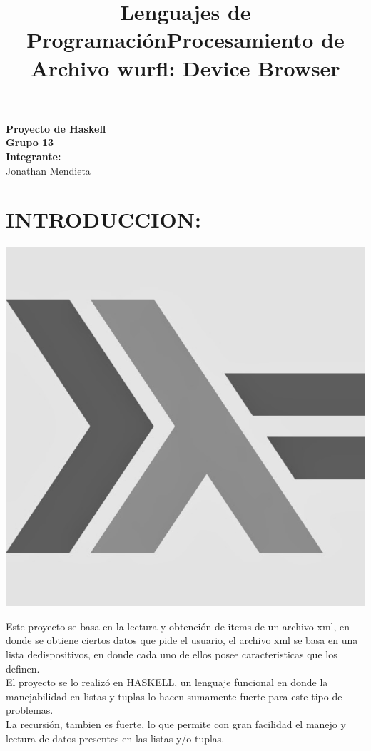 \documentclass[11pt]{article} %
\title{Lenguajes de Programación}
\begin{document}
\maketitle


\begin{center}
\textbf{
{\LARGE Proyecto de Haskell}}\\[1.25cm]
{\LARGE \textbf{Grupo 13}}\\[1cm]
{\LARGE \textbf{ Integrante:}}\\[1cm]
{\Large Jonathan Mendieta}\\[1cm]

\newpage
\end{center}

\newpage
\title{\textbf{Procesamiento de Archivo wurfl: Device Browser}}

\section{INTRODUCCION:}
\begin{center}
\includegraphics[scale=0.2]{screens/haskell.jpg}
\end{center}
Este proyecto se basa en la lectura y obtención de items de un archivo xml, en donde se obtiene ciertos datos que pide el usuario, el archivo xml se basa en una lista dedispositivos, en donde cada uno de ellos posee caracteristicas que los definen.\\
El proyecto se lo realizó en HASKELL, un lenguaje funcional en donde la manejabilidad en listas y tuplas lo hacen sumamente fuerte para este tipo de problemas.\\
La recursión, tambien es fuerte, lo que permite con gran facilidad el manejo y lectura de datos presentes en las listas y/o tuplas.\\
\end{document}
